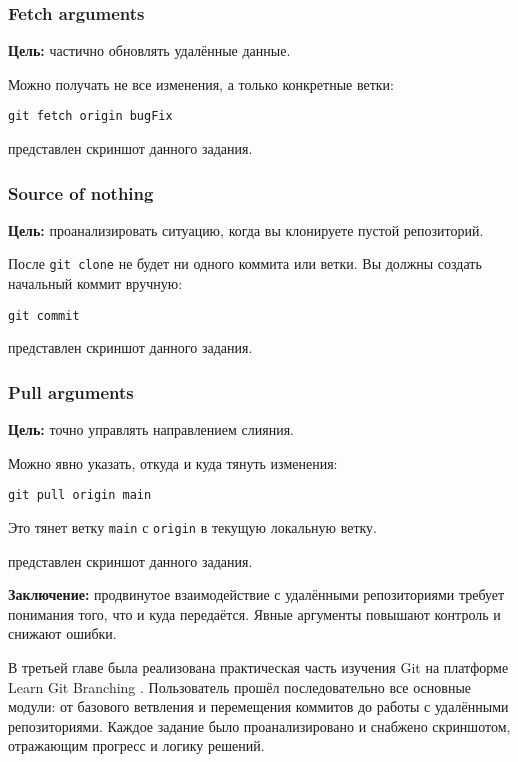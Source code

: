 \documentclass[a4paper,12pt]{report}
\begin{document}
\subsubsection{Fetch arguments}
\textbf{Цель:} частично обновлять удалённые данные.

Можно получать не все изменения, а только конкретные ветки:
\begin{verbatim}
git fetch origin bugFix
\end{verbatim}

 представлен скриншот данного задания.

\subsubsection{Source of nothing}
\textbf{Цель:} проанализировать ситуацию, когда вы клонируете пустой репозиторий.

После \texttt{git clone} не будет ни одного коммита или ветки. Вы должны создать начальный коммит вручную:
\begin{verbatim}
git commit
\end{verbatim}

 представлен скриншот данного задания.

\subsubsection{Pull arguments}
\textbf{Цель:} точно управлять направлением слияния.

Можно явно указать, откуда и куда тянуть изменения:
\begin{verbatim}
git pull origin main
\end{verbatim}

Это тянет ветку \texttt{main} с \texttt{origin} в текущую локальную ветку.

 представлен скриншот данного задания.

\textbf{Заключение:} продвинутое взаимодействие с удалёнными репозиториями требует понимания того, что и куда передаётся. Явные аргументы повышают контроль и снижают ошибки.


В третьей главе была реализована практическая часть изучения Git на платформе Learn Git Branching \cite{learngitbranching}. Пользователь прошёл последовательно все основные модули: от базового ветвления и перемещения коммитов до работы с удалёнными репозиториями. Каждое задание было проанализировано и снабжено скриншотом, отражающим прогресс и логику решений.
\end{document}
